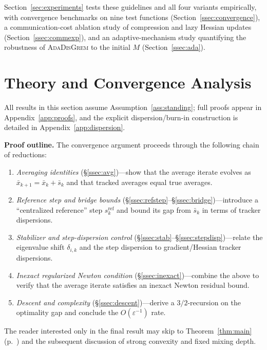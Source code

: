 \documentclass[11pt,a4paper]{article}
\def\cO{O}%
\newcommand{\cO}{\mathcal{O}}
\begin{document}
	\noindent
	Section~\ref{sec:experiments} tests these guidelines and all four
	variants empirically, with convergence benchmarks on nine test functions
	(Section~\ref{ssec:convergence}), a communication-cost ablation study
	of compression and lazy Hessian updates (Section~\ref{ssec:commexp}),
	and an adaptive-mechanism study quantifying the robustness of
	\textsc{AdaDisGrem} to the initial $M$ (Section~\ref{ssec:ada}).
	
	
\section{Theory and Convergence Analysis}\label{sec:theory}
All results in this section assume Assumption~\ref{ass:standing};
full proofs appear in Appendix~\ref{app:proofs}, and the explicit
dispersion/burn-in construction is detailed in
Appendix~\ref{app:dispersion}.

\noindent\textbf{Proof outline.}
The convergence argument proceeds through the following chain of
reductions:
\begin{enumerate}[leftmargin=1.8em,itemsep=1pt,label=\textbf{(\roman*)}]
	\item \emph{Averaging identities}
	  (\S\ref{ssec:avg})---show that the average iterate evolves as
	  $\bar x_{k+1}=\bar x_k+\bar s_k$ and that tracked averages
	  equal true averages.
	\item \emph{Reference step and bridge bounds}
	  (\S\ref{ssec:refstep}--\S\ref{ssec:bridge})---introduce a
	  ``centralized reference'' step $s_k^{\mathrm{ref}}$ and bound
	  its gap from $\bar s_k$ in terms of tracker dispersions.
	\item \emph{Stabilizer and step-dispersion control}
	  (\S\ref{ssec:stab}--\S\ref{ssec:stepdisp})---relate the
	  eigenvalue shift $\delta_{i,k}$ and the step dispersion to
	  gradient/Hessian tracker dispersions.
	\item \emph{Inexact regularized Newton condition}
	  (\S\ref{ssec:inexact})---combine the above to verify that the
	  average iterate satisfies an inexact Newton residual bound.
	\item \emph{Descent and complexity}
	  (\S\ref{ssec:descent})---derive a $3/2$-recursion on the
	  optimality gap and conclude the $\cO(\varepsilon^{-1})$ rate.
\end{enumerate}
The reader interested only in the final result may skip to
Theorem~\ref{thm:main} (p.~\pageref{thm:main}) and the subsequent
discussion of strong convexity and fixed mixing depth.
\end{document}
